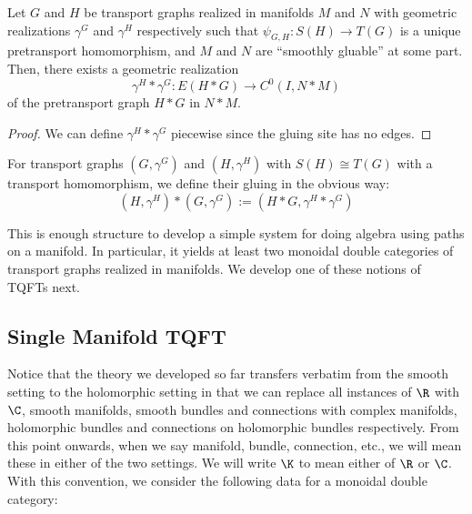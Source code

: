 \documentclass[./Thick_TQFTs_and_Quantum_Information.tex]{subfiles}
\begin{document}
\begin{cor}
Let $G$ and $H$ be transport graphs realized in manifolds
$M$ and $N$ with geometric realizations $\gamma^G$ and
$\gamma^H$ respectively such that $\psi_{G, H} : S(H) \to T(G)$ is a unique
pretransport homomorphism, and $M$ and $N$ are ``smoothly gluable'' at some
part. Then, there exists a geometric realization
\[
  \gamma^H * \gamma^G : E(H * G) \to C^0(I, N * M)
\]
of the pretransport graph $H * G$ in $N * M$.
\end{cor}
\begin{proof}
We can define $\gamma^H * \gamma^G$ piecewise since the gluing site has no
edges.
\end{proof}

\begin{defn}
For transport graphs $(G, \gamma^G)$ and $(H, \gamma^H)$ with $S(H) \cong T(G)$
with a transport homomorphism, we define their gluing in the obvious way:
\[
  (H, \gamma^H) * (G, \gamma^G) := (H * G, \gamma^H * \gamma^G)
\]
\end{defn}

This is enough structure to develop a simple system for doing algebra using
paths on a manifold. In particular, it yields at least two monoidal double
categories of transport graphs realized in manifolds. We develop one of these
notions of TQFTs next.

\subsection{Single Manifold TQFT}\label{subsec:one_man_tqft}

Notice that the theory we developed so far transfers verbatim from the smooth
setting to the holomorphic setting in that we can replace all instances of $\R$
with $\C$, smooth manifolds, smooth bundles and connections with complex
manifolds, holomorphic bundles and connections on holomorphic bundles
respectively. From this point onwards, when we say manifold, bundle, connection,
etc., we will mean these in either of the two settings. We will write $\K$ to
mean either of $\R$ or $\C$. With this convention, we consider the following
data for a monoidal double category:
\end{document}
